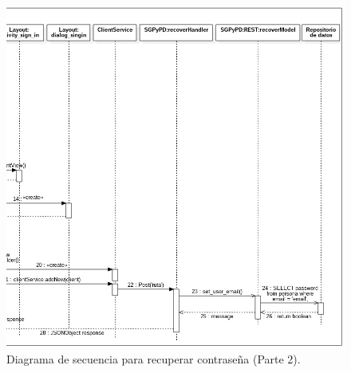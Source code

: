 \FloatBarrier
\begin{figure}[htbp!]
		\centering
			\includegraphics[width=.9 \textwidth]{imagenes/Diagramas_UserApp/Nuevos_diagramas/recuperarContra_2}
		\caption{Diagrama de secuencia para recuperar contraseña (Parte 2).}
		\label{image:DSRecuperaContra1}
\end{figure}
\FloatBarrier

